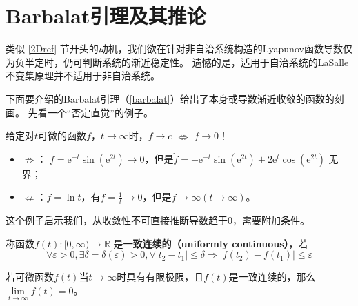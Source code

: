 \section{Barbalat引理及其推论}\label{3Eref}
类似 \ref{2Dref} 节开头的动机，我们欲在针对非自治系统构造的Lyapunov函数导数仅为负半定时，仍可判断系统的渐近稳定性。
遗憾的是，适用于自治系统的LaSalle不变集原理并不适用于非自治系统。

下面要介绍的Barbalat引理（\ref{barbalat}）给出了本身或导数渐近收敛的函数的刻画。
先看一个“否定直觉”的例子。
\begin{example}
    给定对$t$可微的函数$f$，$t \rightarrow \infty$时，$f\to c$  $\nLeftrightarrow $ $\dot{f} \rightarrow 0$！
  \begin{itemize}[leftmargin=1em]
    \item $\nRightarrow $： $f = \mathrm{e}^{- t} \sin (\mathrm{e}^{2 t}) \rightarrow 0$，但是$ \dot{f} = - \mathrm{e}^{- t} \sin
    (\mathrm{e}^{2 t}) + 2\mathrm{e}^t \cos (\mathrm{e}^{2 t})$ 无界；    
    \item $\nLeftarrow $：$f = \ln  t$，有$ \dot{f} = \frac{1}{t} \rightarrow0$，但是$f \rightarrow \infty(t \rightarrow \infty)$。
  \end{itemize}
\end{example}
这个例子启示我们，从收敛性不可直接推断导数趋于$0$，需要附加条件。
\begin{definition}
    称函数$f(t) : [0,\infty) \rightarrow \mathbb{R}$ 是{\bf 一致连续的（uniformly continuous）}，若
     \[\forall \varepsilon > 0, \exists \delta
  = \delta (\varepsilon) > 0, \forall | t_2 - t_1 | \leq \delta \Rightarrow |
  f (t_2) - f (t_1) | \leq \varepsilon\]
\end{definition}
\begin{theorem}[Barbalat引理]\label{barbalat}
    若可微函数$f(t)$当$t\to\infty$时具有有限极限，且$\dot{f}(t)$是一致连续的，那么$\lim\limits_{t\to\infty}\dot{f}(t)=0$。
\end{theorem}

